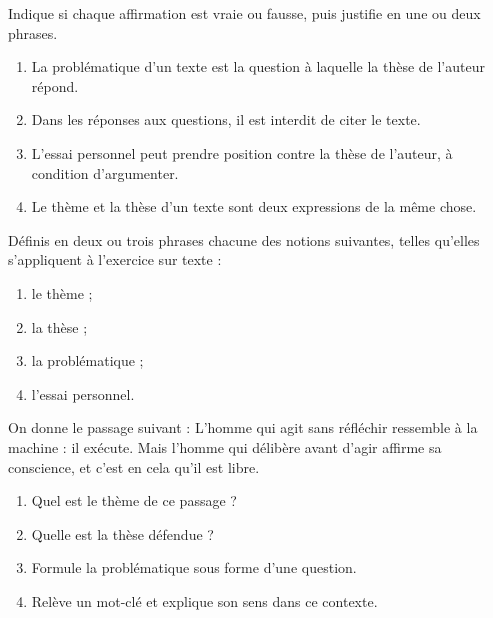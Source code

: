 \documentclass[11pt]{article}
\newcommand{\cle}[1]{{\popxbold\color{popdark}#1}}
\newcounter{popsec}
\newcounter{popsub}
\newcommand{\courssub}[1]{%
  \stepcounter{popsub}%
  \par\vspace{9pt}\noindent{\popxbold\fontsize{11.5}{13}\selectfont\color{popink}{\color{poporange}\thepopsec.\thepopsub}\hspace{6pt}#1}\par\nopagebreak\vspace{4pt}
}
\begin{document}
\begin{exercice}
Indique si chaque affirmation est vraie ou fausse, puis justifie en une ou deux phrases.
\begin{enumerate}
\item La problématique d'un texte est la question à laquelle la thèse de l'auteur répond.
\item Dans les réponses aux questions, il est interdit de citer le texte.
\item L'essai personnel peut prendre position contre la thèse de l'auteur, à condition d'argumenter.
\item Le thème et la thèse d'un texte sont deux expressions de la même chose.
\end{enumerate}
\end{exercice}

\begin{exercice}[Définitions]
Définis en deux ou trois phrases chacune des notions suivantes, telles qu'elles s'appliquent à l'exercice sur texte :
\begin{enumerate}
\item le \cle{thème} ;
\item la \cle{thèse} ;
\item la \cle{problématique} ;
\item l'\cle{essai personnel}.
\end{enumerate}
\end{exercice}

\begin{exercice}
On donne le passage suivant : \og L'homme qui agit sans réfléchir ressemble à la machine : il exécute. Mais l'homme qui délibère avant d'agir affirme sa conscience, et c'est en cela qu'il est libre. \fg
\begin{enumerate}
\item Quel est le thème de ce passage ?
\item Quelle est la thèse défendue ?
\item Formule la problématique sous forme d'une question.
\item Relève un mot-clé et explique son sens dans ce contexte.
\end{enumerate}
\end{exercice}

\courssub{Je m'entraîne}
\end{document}
